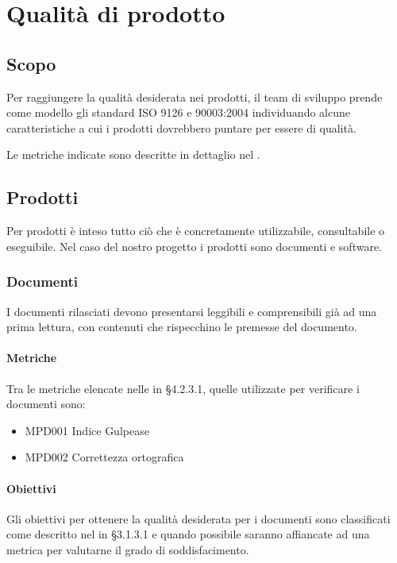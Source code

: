 \section{Qualità di prodotto}

\subsection{Scopo}
Per raggiungere la qualità desiderata nei prodotti, il team di sviluppo prende come modello gli standard ISO 9126 e 90003:2004 individuando alcune caratteristiche a cui i prodotti dovrebbero puntare per essere di qualità.

Le metriche indicate sono descritte in dettaglio nel \Doc{\NdPv}.


\subsection{Prodotti} %
Per prodotti è inteso tutto ciò che è concretamente utilizzabile, consultabile o eseguibile. Nel caso del nostro progetto i prodotti sono documenti e software.
	\subsubsection{Documenti}
	I documenti rilasciati devono presentarsi leggibili e comprensibili già ad una prima lettura, con contenuti che rispecchino le premesse del documento.

		\paragraph{Metriche}
		Tra le metriche elencate nelle \NdPv in  §4.2.3.1, quelle utilizzate per verificare i documenti sono:
		
		\begin{itemize}
			\item MPD001 Indice Gulpease
			\item MPD002 Correttezza ortografica
		\end{itemize} 
		
		\paragraph{Obiettivi}
		Gli obiettivi per ottenere la qualità desiderata per i documenti sono classificati come descritto nel \NdP in §3.1.3.1 e quando possibile saranno affiancate ad una metrica per valutarne il grado di soddisfacimento.
		
